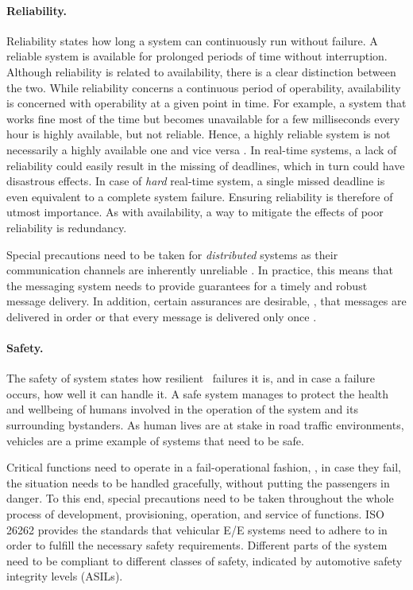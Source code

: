 \paragraph{Reliability.}
Reliability states how long a system can continuously run without failure. A reliable system is available for prolonged periods of time without interruption. Although reliability is related to availability, there is a clear distinction between the two. While reliability concerns a continuous period of operability, availability is concerned with operability at a given point in time. For example, a system that works fine most of the time but becomes unavailable for a few milliseconds every hour is highly available, but not reliable. Hence, a highly reliable system is not necessarily a highly available one and vice versa \cite{tanenbaum2017distributed}. In real-time systems, a lack of reliability could easily result in the missing of deadlines, which in turn could have disastrous effects. In case of \emph{hard} real-time system, a single missed deadline is even equivalent to a complete system failure. Ensuring reliability is therefore of utmost importance. As with availability, a way to mitigate the effects of poor reliability is redundancy.

Special precautions need to be taken for \emph{distributed} systems as their communication channels are inherently unreliable \cite{tanenbaum2017distributed}. In practice, this means that the messaging system needs to provide guarantees for a timely and robust message delivery. In addition, certain assurances are desirable, \eg , that messages are delivered in order or that every message is delivered only once \cite{o2007quality}. 

\paragraph{Safety.}
The safety of system states how resilient \wrt\ failures it is, and in case a failure occurs, how well it can handle it. A safe system manages to protect the health and wellbeing of humans involved in the operation of the system and its surrounding bystanders.
As human lives are at stake in road traffic environments, vehicles are a prime example of systems that need to be safe.

Critical functions need to operate in a fail-operational fashion, \ie , in case they fail, the situation needs to be handled gracefully, without putting the passengers in danger. To this end, special precautions need to be taken throughout the whole process of development, provisioning, operation, and service of functions. ISO 26262 \cite{iso201126262} provides the standards that vehicular E/E systems need to adhere to in order to fulfill the necessary safety requirements. Different parts of the system need to be compliant to different classes of safety, indicated by automotive safety integrity levels (ASILs).


